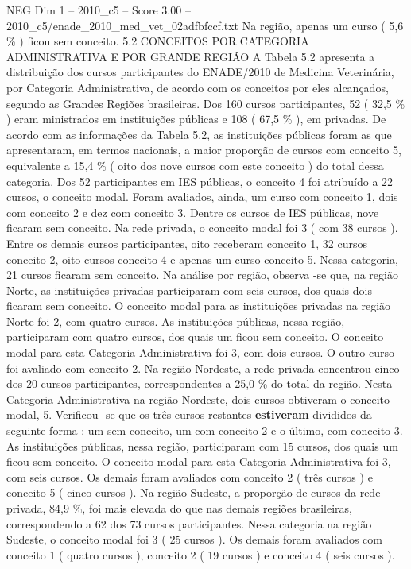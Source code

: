 \begin{textsample}{NEG Dim 1 – 2010\_c5 – Score 3.00 – 2010\_c5/enade\_2010\_med\_vet\_02adfbfccf.txt}
Na região, apenas um curso ( 5,6 \% ) ficou sem conceito. 5.2 CONCEITOS POR CATEGORIA ADMINISTRATIVA E POR GRANDE REGIÃO A Tabela 5.2 apresenta a distribuição dos cursos participantes do ENADE/2010 de Medicina Veterinária, por Categoria Administrativa, de acordo com os conceitos por eles alcançados, segundo as Grandes Regiões brasileiras.
Dos 160 cursos participantes, 52 ( 32,5 \% ) eram ministrados em instituições públicas e 108 ( 67,5 \% ), em privadas.
De acordo com as informações da Tabela 5.2, as instituições públicas foram as que apresentaram, em termos nacionais, a maior proporção de cursos com conceito 5, equivalente a 15,4 \% ( oito dos nove cursos com este conceito ) do total dessa categoria.
Dos 52 participantes em IES públicas, o conceito 4 foi atribuído a 22 cursos, o conceito modal.
Foram avaliados, ainda, um curso com conceito 1, dois com conceito 2 e dez com conceito 3.
Dentre os cursos de IES públicas, nove ficaram sem conceito.
Na rede privada, o conceito modal foi 3 ( com 38 cursos ).
Entre os demais cursos participantes, oito receberam conceito 1, 32 cursos conceito 2, oito cursos conceito 4 e apenas um curso conceito 5.
Nessa categoria, 21 cursos ficaram sem conceito.
Na análise por região, observa -se que, na região Norte, as instituições privadas participaram com seis cursos, dos quais dois ficaram sem conceito.
O conceito modal para as instituições privadas na região Norte foi 2, com quatro cursos.
As instituições públicas, nessa região, participaram com quatro cursos, dos quais um ficou sem conceito.
O conceito modal para esta Categoria Administrativa foi 3, com dois cursos.
O outro curso foi avaliado com conceito 2.
Na região Nordeste, a rede privada concentrou cinco dos 20 cursos participantes, correspondentes a 25,0 \% do total da região.
Nesta Categoria Administrativa na região Nordeste, dois cursos obtiveram o conceito modal, 5.
Verificou -se que os três cursos restantes \textbf{estiveram} divididos da seguinte forma : um sem conceito, um com conceito 2 e o último, com conceito 3.
As instituições públicas, nessa região, participaram com 15 cursos, dos quais um ficou sem conceito.
O conceito modal para esta Categoria Administrativa foi 3, com seis cursos.
Os demais foram avaliados com conceito 2 ( três cursos ) e conceito 5 ( cinco cursos ).
Na região Sudeste, a proporção de cursos da rede privada, 84,9 \%, foi mais elevada do que nas demais regiões brasileiras, correspondendo a 62 dos 73 cursos participantes.
Nessa categoria na região Sudeste, o conceito modal foi 3 ( 25 cursos ).
Os demais foram avaliados com conceito 1 ( quatro cursos ), conceito 2 ( 19 cursos ) e conceito 4 ( seis cursos ).

\end{textsample}

